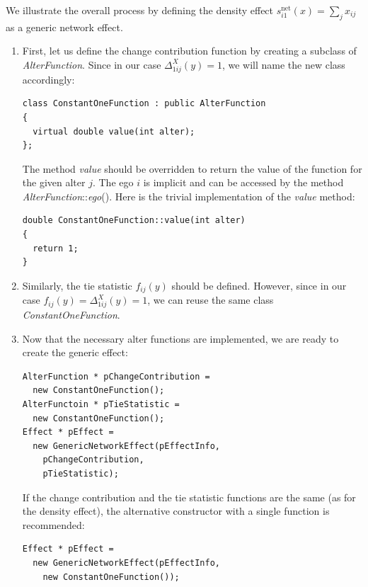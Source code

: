 \documentclass[12pt]{article}
\renewcommand{\=}{\,=\,}
\newcommand{\+}{\,+\,}
\newcommand{\nnm}[1]{\textsf{\small\textit{#1}}}
\begin{document}
We illustrate the overall process by defining the density effect $s_{i1}^\mathrm{net}(x)=\sum_j x_{ij}$
as a generic network effect.

\begin{enumerate}
\item First, let us define the change contribution function by creating a subclass of \nnm{AlterFunction}. Since in our
case $\Delta_{1ij}^X(y)=1$, we will name the new class accordingly:
\begin{verbatim}
class ConstantOneFunction : public AlterFunction
{
  virtual double value(int alter);
};
\end{verbatim}
The method \nnm{value} should be overridden to return the value of the function for the given alter $j$. The ego $i$ is
implicit and can be accessed by the method \nnm{AlterFunction}::\nnm{ego}(). Here is the trivial implementation of
the \nnm{value} method:
\begin{verbatim}
double ConstantOneFunction::value(int alter)
{
  return 1;
}
\end{verbatim}

\item Similarly, the tie statistic $f_{ij}(y)$ should be defined. However, since in our case
$f_{ij}(y)=\Delta_{1ij}^X(y)=1$, we can reuse the same class \nnm{ConstantOneFunction}.

\item Now that the necessary alter functions are implemented, we are ready to create the generic effect:
\begin{verbatim}
AlterFunction * pChangeContribution =
  new ConstantOneFunction();
AlterFunctoin * pTieStatistic =
  new ConstantOneFunction();
Effect * pEffect =
  new GenericNetworkEffect(pEffectInfo,
    pChangeContribution,
    pTieStatistic);
\end{verbatim}
If the change contribution and the tie statistic functions are the same (as for the density effect),
the alternative constructor with a single function is recommended:
\begin{verbatim}
Effect * pEffect =
  new GenericNetworkEffect(pEffectInfo,
    new ConstantOneFunction());
\end{verbatim}
\end{enumerate}
\end{document}
